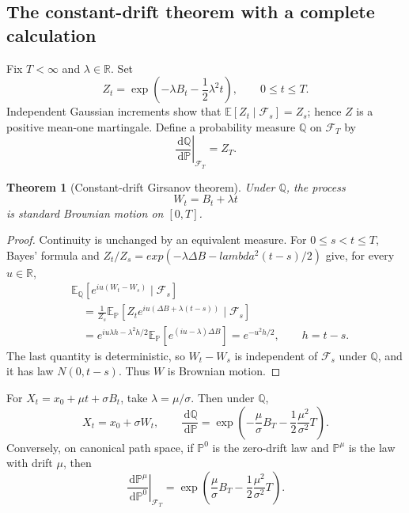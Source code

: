 \documentclass[10pt,a4paper]{article}
\numberwithin{equation}{section}
\theoremstyle{blueplain}
\newtheorem{theorem}{Theorem}[section]
\theoremstyle{definition}
\newcommand{\E}{\mathbb E}
\newcommand{\Pp}{\mathbb P}
\newcommand{\R}{\mathbb R}
\newcommand{\F}{\mathcal F}
\newcommand{\dd}{\,\mathrm d}
\begin{document}
\subsection{The constant-drift theorem with a complete calculation}

Fix \(T<\infty\) and \(\lambda\in\R\).  Set
\begin{equation}
 Z_t=\exp\!\left(-\lambda B_t-\frac12\lambda^2t\right),
 \qquad 0\le t\le T.
 \label{eq:girsanov-density-constant}
\end{equation}
Independent Gaussian increments show that
\(\E[Z_t\mid\F_s]=Z_s\); hence \(Z\) is a positive mean-one martingale.
Define a probability measure \(\mathbb Q\) on \(\F_T\) by
\begin{equation}
  \left.\frac{\dd\mathbb Q}{\dd\Pp}\right|_{\F_T}=Z_T.
  \label{eq:RN-QP}
\end{equation}

\begin{theorem}[Constant-drift Girsanov theorem]
Under \(\mathbb Q\), the process
\begin{equation}
  W_t=B_t+\lambda t
  \label{eq:girsanov-new-brownian}
\end{equation}
is standard Brownian motion on \([0,T]\).
\end{theorem}

\begin{proof}
Continuity is unchanged by an equivalent measure.  For \(0\le s<t\le T\),
Bayes' formula and \(Z_t/Z_s=exp(-\lambda\Delta B-lambda^2(t-s)/2)\)
give, for every \(u\in\R\),
\begin{align*}
 &\E_{\mathbb Q}
 \left[e^{iu(W_t-W_s)}\mid\F_s\right]\\
 &\quad=\frac1{Z_s}\E_{\Pp}
 \left[Z_t e^{iu(\Delta B+\lambda(t-s))}\mid\F_s\right]\\
 &\quad=e^{iu\lambda h-\lambda^2h/2}
   \E_{\Pp}[e^{(iu-\lambda)\Delta B}]
 =e^{-u^2h/2},\qquad h=t-s.
\end{align*}
The last quantity is deterministic, so \(W_t-W_s\) is independent of
\(\F_s\) under \(\mathbb Q\), and it has law \(N(0,t-s)\).  Thus \(W\) is
Brownian motion.
\end{proof}

For \(X_t=x_0+\mu t+\sigma B_t\), take \(\lambda=\mu/\sigma\).  Then under
\(\mathbb Q\),
\begin{equation}
  X_t=x_0+\sigma W_t,
  \qquad
  \frac{\dd\mathbb Q}{\dd\Pp}
  =\exp\!\left(
    -\frac\mu\sigma B_T-\frac12\frac{\mu^2}{\sigma^2}T
  \right).
  \label{eq:drift-removal-density}
\end{equation}
Conversely, on canonical path space, if \(\Pp^0\) is the zero-drift law and
\(\Pp^\mu\) is the law with drift \(\mu\), then
\begin{equation}
  \left.\frac{\dd\Pp^\mu}{\dd\Pp^0}\right|_{\F_T}
  =\exp\!\left(
    \frac\mu\sigma B_T-\frac12\frac{\mu^2}{\sigma^2}T
  \right).
  \label{eq:drifted-over-wiener}
\end{equation}
\end{document}
